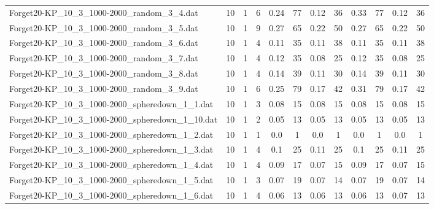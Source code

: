 \begin{sidewaystable}[!ht]
{\begin{tabular}{lccccccccccc}
Forget20-KP\_10\_3\_1000-2000\_random\_3\_4.dat & 10 & 1 & 6 & 0.24 & 77 &  \textcolor{blue2}{0.12} & 36 & 0.33 & 77 &  \textcolor{blue2}{0.12} & 36 \\
Forget20-KP\_10\_3\_1000-2000\_random\_3\_5.dat & 10 & 1 & 9 & 0.27 & 65 &  \textcolor{blue2}{0.22} & 50 & 0.27 & 65 &  \textcolor{blue2}{0.22} & 50 \\
Forget20-KP\_10\_3\_1000-2000\_random\_3\_6.dat & 10 & 1 & 4 &  \textcolor{blue2}{0.11} & 35 &  \textcolor{blue2}{0.11} & 38 &  \textcolor{blue2}{0.11} & 35 &  \textcolor{blue2}{0.11} & 38 \\
Forget20-KP\_10\_3\_1000-2000\_random\_3\_7.dat & 10 & 1 & 4 & 0.12 & 35 &  \textcolor{blue2}{0.08} & 25 & 0.12 & 35 &  \textcolor{blue2}{0.08} & 25 \\
Forget20-KP\_10\_3\_1000-2000\_random\_3\_8.dat & 10 & 1 & 4 & 0.14 & 39 &  \textcolor{blue2}{0.11} & 30 & 0.14 & 39 &  \textcolor{blue2}{0.11} & 30 \\
Forget20-KP\_10\_3\_1000-2000\_random\_3\_9.dat & 10 & 1 & 6 & 0.25 & 79 &  \textcolor{blue2}{0.17} & 42 & 0.31 & 79 &  \textcolor{blue2}{0.17} & 42 \\
Forget20-KP\_10\_3\_1000-2000\_spheredown\_1\_1.dat & 10 & 1 & 3 &  \textcolor{blue2}{0.08} & 15 &  \textcolor{blue2}{0.08} & 15 &  \textcolor{blue2}{0.08} & 15 &  \textcolor{blue2}{0.08} & 15 \\
Forget20-KP\_10\_3\_1000-2000\_spheredown\_1\_10.dat & 10 & 1 & 2 &  \textcolor{blue2}{0.05} & 13 &  \textcolor{blue2}{0.05} & 13 &  \textcolor{blue2}{0.05} & 13 &  \textcolor{blue2}{0.05} & 13 \\
Forget20-KP\_10\_3\_1000-2000\_spheredown\_1\_2.dat & 10 & 1 & 1 &  \textcolor{blue2}{0.0} & 1 &  \textcolor{blue2}{0.0} & 1 &  \textcolor{blue2}{0.0} & 1 &  \textcolor{blue2}{0.0} & 1 \\
Forget20-KP\_10\_3\_1000-2000\_spheredown\_1\_3.dat & 10 & 1 & 4 &  \textcolor{blue2}{0.1} & 25 & 0.11 & 25 &  \textcolor{blue2}{0.1} & 25 & 0.11 & 25 \\
Forget20-KP\_10\_3\_1000-2000\_spheredown\_1\_4.dat & 10 & 1 & 4 & 0.09 & 17 &  \textcolor{blue2}{0.07} & 15 & 0.09 & 17 &  \textcolor{blue2}{0.07} & 15 \\
Forget20-KP\_10\_3\_1000-2000\_spheredown\_1\_5.dat & 10 & 1 & 3 &  \textcolor{blue2}{0.07} & 19 &  \textcolor{blue2}{0.07} & 14 &  \textcolor{blue2}{0.07} & 19 &  \textcolor{blue2}{0.07} & 14 \\
Forget20-KP\_10\_3\_1000-2000\_spheredown\_1\_6.dat & 10 & 1 & 4 &  \textcolor{blue2}{0.06} & 13 &  \textcolor{blue2}{0.06} & 13 &  \textcolor{blue2}{0.06} & 13 & 0.07 & 13 \\

\end{tabular}}
\end{sidewaystable}
